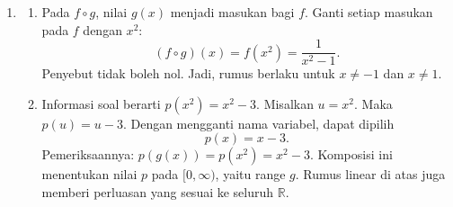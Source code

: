 \documentclass[10pt,letterpaper]{article}
\newcommand{\R}{\mathbb{R}}
\begin{document}
\begin{enumerate}
  \item \begin{enumerate}
          \item Pada $f\circ g$, nilai $g(x)$ menjadi masukan bagi $f$.
                Ganti setiap masukan pada $f$ dengan $x^2$:
                \[
                  (f\circ g)(x)=f(x^2)=\boxed{\frac1{x^2-1}}.
                \]
                Penyebut tidak boleh nol.
                Jadi, rumus berlaku untuk $x\ne-1$ dan $x\ne1$.

          \item Informasi soal berarti $p(x^2)=x^2-3$.
                Misalkan $u=x^2$. Maka $p(u)=u-3$.
                Dengan mengganti nama variabel, dapat dipilih
                \[
                  \boxed{p(x)=x-3}.
                \]
                Pemeriksaannya: $p(g(x))=p(x^2)=x^2-3$.
                Komposisi ini menentukan nilai $p$ pada $[0,\infty)$, yaitu range $g$.
                Rumus linear di atas juga memberi perluasan yang sesuai ke seluruh $\R$.
        \end{enumerate}

\end{enumerate}
\par\endgroup

\newpage
\end{document}

